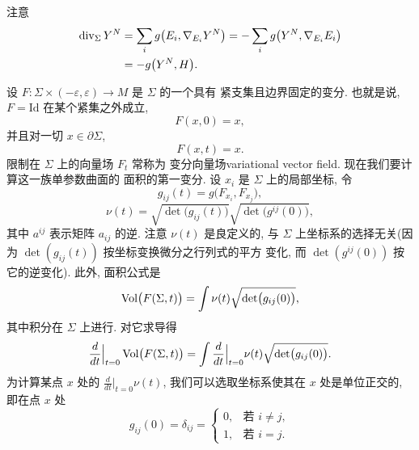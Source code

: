 \begin{remark}
\label{rem:1.3}
注意
\begin{align}
\operatorname{div}_{\Sigma}Y^N
 &=\sum_i g\bigl(E_i,\nabla_{E_i}Y^N\bigr)
  =-\sum_i g\bigl(Y^N,\nabla_{E_i}E_i\bigr) \notag\\
 &=-g\bigl(Y^N,H\bigr).
\label{eq:1.35}
\end{align}
\end{remark}

设 $F:\Sigma\times(-\varepsilon,\varepsilon)\to M$ 是 $\Sigma$ 的一个具有
紧支集且边界固定的变分. 也就是说, $F=\mathrm{Id}$ 在某个紧集之外成立,
\begin{equation}
F(x,0)=x,
\label{eq:1.36}
\end{equation}
并且对一切 $x\in\partial\Sigma$,
\begin{equation}
F(x,t)=x.
\label{eq:1.37}
\end{equation}
限制在 $\Sigma$ 上的向量场 $F_t$ 常称为
{变分向量场}{variational vector field}. 现在我们要计算这一族单参数曲面的
面积的第一变分. 设 $x_i$ 是 $\Sigma$ 上的局部坐标, 令
\begin{equation}
g_{ij}(t)=g\bigl(F_{x_i},F_{x_j}\bigr),
\label{eq:1.38}
\end{equation}
\begin{equation}
\nu(t)=\sqrt{\det\bigl(g_{ij}(t)\bigr)}\sqrt{\det\bigl(g^{ij}(0)\bigr)},
\label{eq:1.39}
\end{equation}
其中 $a^{ij}$ 表示矩阵 $a_{ij}$ 的逆. 注意 $\nu(t)$ 是良定义的, 与 $\Sigma$
上坐标系的选择无关(因为 $\det(g_{ij}(t))$ 按坐标变换微分之行列式的平方
变化, 而 $\det(g^{ij}(0))$ 按它的逆变化). 此外, 面积公式是
\begin{equation}
\operatorname{Vol}\bigl(F(\Sigma,t)\bigr)=\int\nu(t)\sqrt{\det\bigl(g_{ij}(0)\bigr)},
\label{eq:1.40}
\end{equation}
其中积分在 $\Sigma$ 上进行. 对它求导得
\begin{equation}
\frac{d}{dt}\Big|_{t=0}\operatorname{Vol}\bigl(F(\Sigma,t)\bigr)
 =\int\frac{d}{dt}\Big|_{t=0}\nu(t)\sqrt{\det\bigl(g_{ij}(0)\bigr)}.
\label{eq:1.41}
\end{equation}
为计算某点 $x$ 处的 $\frac{d}{dt}|_{t=0}\nu(t)$, 我们可以选取坐标系使其在
$x$ 处是单位正交的, 即在点 $x$ 处
\begin{equation}
g_{ij}(0)=\delta_{ij}=
\begin{cases}
0, & \text{若 } i\neq j,\\
1, & \text{若 } i=j.
\end{cases}
\label{eq:1.42}
\end{equation}
